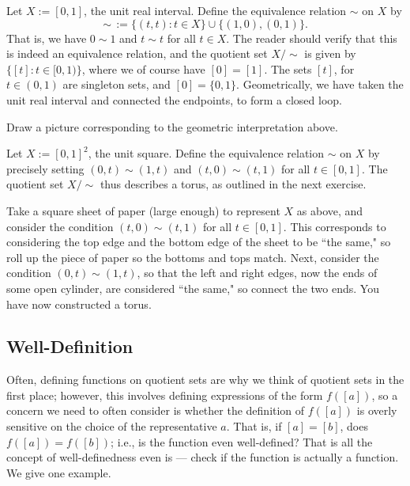 \documentclass{article}
\begin{document}
\begin{example}
Let $X := [0,1]$, the unit real interval. Define the equivalence relation $\sim$ on $X$ by
$$\sim \, := \{(t, t): t\in X\} \cup \{(1, 0), (0, 1)\}.$$
That is, we have $0\sim 1$ and $t\sim t$ for all $t\in X$. The reader should verify that this is indeed an equivalence relation, and the quotient set $X/\sim$ is given by $\{[t]: t\in [0, 1)\}$, where we of course have $[0] = [1]$. The sets $[t]$, for $t\in (0,1)$ are singleton sets, and $[0] = \{0, 1\}$. Geometrically, we have taken the unit real interval and connected the endpoints, to form a closed loop.
\end{example}

\begin{exercise}
Draw a picture corresponding to the geometric interpretation above.
\end{exercise}

\newpage
\begin{example}
Let $X := [0,1]^2$, the unit square. Define the equivalence relation $\sim$ on $X$ by precisely setting $(0, t) \sim (1, t)$ and $(t, 0)\sim (t,1)$ for all $t\in [0, 1]$. The quotient set $X/\sim$ thus describes a torus, as outlined in the next exercise.
\end{example}

\begin{exercise}
Take a square sheet of paper (large enough) to represent $X$ as above, and consider the condition $(t, 0) \sim (t, 1)$ for all $t\in [0, 1]$. This corresponds to considering the top edge and the bottom edge of the sheet to be ``the same," so roll up the piece of paper so the bottoms and tops match. Next, consider the condition $(0, t) \sim (1,t)$, so that the left and right edges, now the ends of some open cylinder, are considered ``the same," so connect the two ends. You have now constructed a torus.
\end{exercise}

\subsection*{Well-Definition}
Often, defining functions on quotient sets are why we think of quotient sets in the first place; however, this involves defining expressions of the form $f([a])$, so a concern we need to often consider is whether the definition of $f([a])$ is overly sensitive on the choice of the representative $a$. That is, if $[a] = [b]$, does $f([a]) = f([b])$; i.e., is the function even well-defined? That is all the concept of well-definedness even is --- check if the function is actually a function. We give one example.
\end{document}
